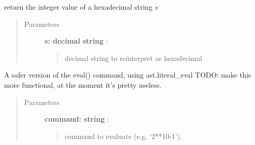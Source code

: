 \documentclass[letterpaper,10pt,english]{sphinxmanual}
\begin{document}

\begin{fulllineitems}
\label{index:roachnest_helpers.hex2dec}
return the integer value of a hexadecimal string \emph{s}
\begin{quote}\begin{description}
\item[{Parameters }] \leavevmode
\textbf{s: decimal string} :
\begin{quote}

decimal string to reinterpret as hexadecimal
\end{quote}

\end{description}\end{quote}

\end{fulllineitems}



\begin{fulllineitems}
\label{index:roachnest_helpers.safe_eval}
A safer version of the eval() command, using ast.literal\_eval
TODO: make this more functional, at the moment it's pretty useless.
\begin{quote}\begin{description}
\item[{Parameters }] \leavevmode
\textbf{command: string} :
\begin{quote}

command to evaluate (e.g. `2**10-1').
\end{quote}

\end{description}\end{quote}

\end{fulllineitems}


\end{document}
